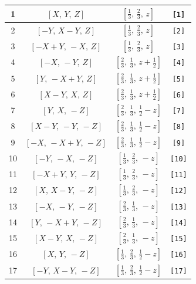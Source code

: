 \documentclass[fleqn,8pt]{jsarticle}
\begin{document}
\begin{longtable}{cccc}
1 & $\left[ X,\, Y,\, Z \right]$ & $\left[ \frac{1}{3},\, \frac{2}{3},\, z \right]$ & {\tt [1]} \\ \hline
2 & $\left[ - Y,\, X - Y,\, Z \right]$ & $\left[ \frac{1}{3},\, \frac{2}{3},\, z \right]$ & {\tt [2]} \\ \hline
3 & $\left[ - X + Y,\, - X,\, Z \right]$ & $\left[ \frac{1}{3},\, \frac{2}{3},\, z \right]$ & {\tt [3]} \\ \hline
4 & $\left[ - X,\, - Y,\, Z \right]$ & $\left[ \frac{2}{3},\, \frac{1}{3},\, z + \frac{1}{2} \right]$ & {\tt [4]} \\ \hline
5 & $\left[ Y,\, - X + Y,\, Z \right]$ & $\left[ \frac{2}{3},\, \frac{1}{3},\, z + \frac{1}{2} \right]$ & {\tt [5]} \\ \hline
6 & $\left[ X - Y,\, X,\, Z \right]$ & $\left[ \frac{2}{3},\, \frac{1}{3},\, z + \frac{1}{2} \right]$ & {\tt [6]} \\ \hline
7 & $\left[ Y,\, X,\, - Z \right]$ & $\left[ \frac{2}{3},\, \frac{1}{3},\, \frac{1}{2} - z \right]$ & {\tt [7]} \\ \hline
8 & $\left[ X - Y,\, - Y,\, - Z \right]$ & $\left[ \frac{2}{3},\, \frac{1}{3},\, \frac{1}{2} - z \right]$ & {\tt [8]} \\ \hline
9 & $\left[ - X,\, - X + Y,\, - Z \right]$ & $\left[ \frac{2}{3},\, \frac{1}{3},\, \frac{1}{2} - z \right]$ & {\tt [9]} \\ \hline
10 & $\left[ - Y,\, - X,\, - Z \right]$ & $\left[ \frac{1}{3},\, \frac{2}{3},\, - z \right]$ & {\tt [10]} \\ \hline
11 & $\left[ - X + Y,\, Y,\, - Z \right]$ & $\left[ \frac{1}{3},\, \frac{2}{3},\, - z \right]$ & {\tt [11]} \\ \hline
12 & $\left[ X,\, X - Y,\, - Z \right]$ & $\left[ \frac{1}{3},\, \frac{2}{3},\, - z \right]$ & {\tt [12]} \\ \hline
13 & $\left[ - X,\, - Y,\, - Z \right]$ & $\left[ \frac{2}{3},\, \frac{1}{3},\, - z \right]$ & {\tt [13]} \\ \hline
14 & $\left[ Y,\, - X + Y,\, - Z \right]$ & $\left[ \frac{2}{3},\, \frac{1}{3},\, - z \right]$ & {\tt [14]} \\ \hline
15 & $\left[ X - Y,\, X,\, - Z \right]$ & $\left[ \frac{2}{3},\, \frac{1}{3},\, - z \right]$ & {\tt [15]} \\ \hline
16 & $\left[ X,\, Y,\, - Z \right]$ & $\left[ \frac{1}{3},\, \frac{2}{3},\, \frac{1}{2} - z \right]$ & {\tt [16]} \\ \hline
17 & $\left[ - Y,\, X - Y,\, - Z \right]$ & $\left[ \frac{1}{3},\, \frac{2}{3},\, \frac{1}{2} - z \right]$ & {\tt [17]} \\ \hline

\end{longtable}
\end{document}
